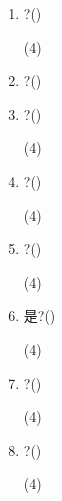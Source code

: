 \documentclass[11pt]{ctexart}
\begin{document}
    \begin{enumerate}
        \item ?(\qquad)
        \begin{tasks}(4)
            \task 
            \task 
            \task 
            \task 
        \end{tasks}

        \item ?(\qquad)
        \begin{tasks}
            \task 
            \task 
            \task 
            \task 
        \end{tasks}

        \item ?(\qquad)
        \begin{tasks}(4)
            \task 
            \task 
            \task 
            \task 
        \end{tasks}

        \item ?(\qquad)
        \begin{tasks}(4)
            \task 
            \task 
            \task 
            \task 
        \end{tasks}

        \item ?(\qquad)
        \begin{tasks}(4)
            \task 
            \task 
            \task 
            \task 
        \end{tasks}

        \item 是?(\qquad)
        \begin{tasks}(4)
            \task 
            \task 
            \task 
            \task 
        \end{tasks}

        \item ?(\qquad)
        \begin{tasks}(4)
            \task 
            \task 
            \task 
            \task 
        \end{tasks}

        \item ?(\qquad)
        \begin{tasks}(4)
            \task 
            \task 
            \task 
            \task 
        \end{tasks}


\end{enumerate}
\end{document}
